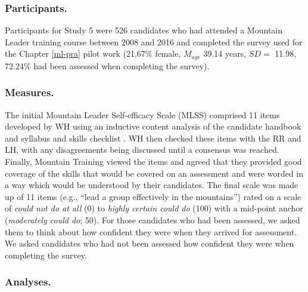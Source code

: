 \documentclass[
  12pt,
  a4paper,
]{book}
\begin{document}
\hypertarget{study-5-participants}{%
\subsubsection{Participants.}\label{study-5-participants}}

Participants for Study 5 were 526 candidates who had attended a Mountain Leader training course between 2008 and 2016 and completed the survey used for the Chapter \ref{ml-pra} pilot work (21.67\% female, \(M_{age}\) 39.14 years, \(SD =\) 11.98, 72.24\% had been assessed when completing the survey).

\hypertarget{study-5-measures}{%
\subsubsection{Measures.}\label{study-5-measures}}

The initial Mountain Leader Self-efficacy Scale (MLSS) comprised 11 items developed by WH using an inductive content analysis \citep{Cho2014} of the candidate handbook and syllabus \citep{MTUK2015a} and skills checklist \citep{MTUK2015a}. WH then checked these items with the RR and LH, with any disagreements being discussed until a consensus was reached. Finally, Mountain Training viewed the items and agreed that they provided good coverage of the skills that would be covered on an assessment and were worded in a way which would be understood by their candidates. The final scale was made up of 11 items (e.g., ``lead a group effectively in the mountains'') rated on a scale of \emph{could not do at all} (0) to \emph{highly certain could do} (100) with a mid-point anchor (\emph{moderately could do}; 50). For those candidates who had been assessed, we asked them to think about how confident they were when they arrived for assessment. We asked candidates who had not been assessed how confident they were when completing the survey.

\hypertarget{study-5-analyses}{%
\subsubsection{Analyses.}\label{study-5-analyses}}
\end{document}
